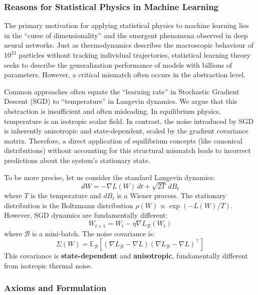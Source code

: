 \subsubsection{Reasons for Statistical Physics in Machine Learning}

The primary motivation for applying statistical physics to machine learning lies in the ``curse of dimensionality'' and the emergent phenomena observed in deep neural networks. Just as thermodynamics describes the macroscopic behaviour of $10^{23}$ particles without tracking individual trajectories, statistical learning theory seeks to describe the generalization performance of models with billions of parameters. However, a critical mismatch often occurs in the abstraction level.

Common approaches often equate the ``learning rate'' in Stochastic Gradient Descent (SGD) to ``temperature'' in Langevin dynamics. We argue that this abstraction is insufficient and often misleading. In equilibrium physics, temperature is an isotropic scalar field. In contrast, the noise introduced by SGD is inherently anisotropic and state-dependent, scaled by the gradient covariance matrix. Therefore, a direct application of equilibrium concepts (like canonical distributions) without accounting for this structural mismatch leads to incorrect predictions about the system's stationary state.

To be more precise, let us consider the standard Langevin dynamics:
\begin{equation}
    dW = -\nabla L(W) \, dt + \sqrt{2T} \, dB_t
\end{equation}
where $T$ is the temperature and $dB_t$ is a Wiener process. The stationary distribution is the Boltzmann distribution $\rho(W) \propto \exp(-L(W)/T)$. However, SGD dynamics are fundamentally different:
\begin{equation}
    W_{t+1} = W_t - \eta \nabla L_{\mathcal{B}}(W_t)
\end{equation}
where $\mathcal{B}$ is a mini-batch. The noise covariance is:
\begin{equation}
    \Sigma(W) = \mathbb{E}_{\mathcal{B}}\left[(\nabla L_{\mathcal{B}} - \nabla L)(\nabla L_{\mathcal{B}} - \nabla L)^\top\right]
\end{equation}
This covariance is \textbf{state-dependent} and \textbf{anisotropic}, fundamentally different from isotropic thermal noise.

\subsubsection{Axioms and Formulation}


